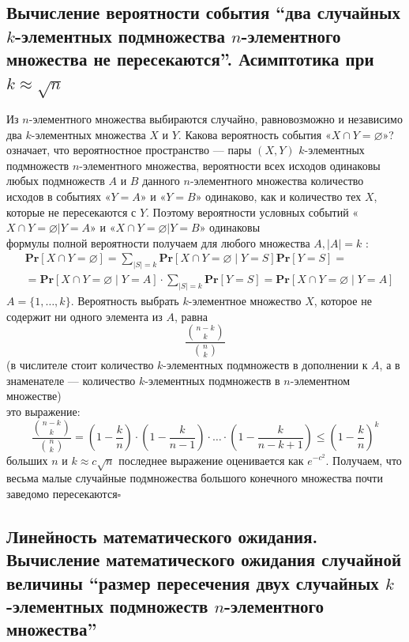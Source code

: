 \documentclass[a4paper]{article}
\newcommand{\qed}{\hfill$\square$}
\begin{document}
\subsection{Вычисление вероятности события “два случайных
\texorpdfstring{$k$}{k}-элементных подмножества
\texorpdfstring{$n$}{n}-элементного множества не пересекаются”. Асимптотика при \texorpdfstring{$k\approx\sqrt{n}$}{k=vn}}
\label{2.37}
Из $n$-элементного множества выбираются случайно, равновозможно и независимо два $k$-элементных множества $X$ и $Y$. Какова вероятность события «$X \cap Y=\varnothing$»?\\
 означает, что вероятностное пространство — пары $(X, Y)$ $k$-элементных подмножеств $n$-элементного множества, вероятности всех исходов одинаковы\\
 любых подмножеств $A$ и $B$ данного $n$-элементного множества количество исходов в событиях «$Y=A$» и «$Y=B$» одинаково, как и количество тех $X$, которые не пересекаются с $Y$. Поэтому вероятности условных событий «$X \cap Y=\varnothing | Y=A$» и «$X \cap Y=\varnothing | Y=B$» одинаковы\\
 формулы полной вероятности получаем для любого множества $A,|A|=k$ :
$$
\begin{aligned}
& \textbf{Pr}[X \cap Y=\varnothing]=\sum_{|S|=k} \textbf{Pr}[X \cap Y=\varnothing \mid Y=S] \textbf{Pr}[Y=S]= \\
& =\textbf{Pr}[X \cap Y=\varnothing \mid Y=A] \cdot \sum_{|S|=k} \textbf{Pr}[Y=S]=\textbf{Pr}[X \cap Y=\varnothing \mid Y=A]
\end{aligned}
$$
 $A=\{1, \ldots, k\}$. Вероятность выбрать $k$-элементное множество $X$, которое не содержит ни одного элемента из $A$, равна
$$\displaystyle\frac{\binom{n-k}{k}}{\binom{n}{k}}$$
(в числителе стоит количество $k$-элементных подмножеств в дополнении к $A$, а в знаменателе — количество $k$-элементных подмножеств в $n$-элементном множестве)\\
 это выражение:
$$
\displaystyle\frac{\binom{n-k}{k}}{\binom{n}{k}}=\left(1-\frac{k}{n}\right) \cdot\left(1-\frac{k}{n-1}\right) \cdot \ldots \cdot\left(1-\frac{k}{n-k+1}\right) \leqslant\left(1-\frac{k}{n}\right)^k
$$
 больших $n$ и $k \approx c \sqrt{n}$ последнее выражение оценивается как $e^{-c^2}$. Получаем, что весьма малые случайные подмножества большого конечного множества почти заведомо пересекаются\qed


\subsection{Линейность математического ожидания. Вычисление математического ожидания случайной величины “размер пересечения двух случайных \texorpdfstring{$k$}{k}-элементных подмножеств \texorpdfstring{$n$}{n}-элементного множества”}
\end{document}
